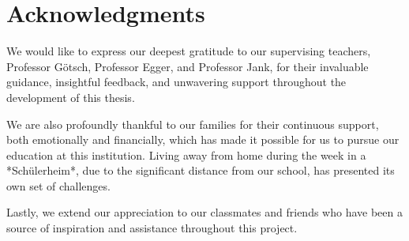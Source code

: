 \chapter*{Acknowledgments}

We would like to express our deepest gratitude to our supervising teachers, Professor Götsch, Professor Egger, and Professor Jank, for their invaluable guidance, insightful feedback, and unwavering support throughout the development of this thesis.

We are also profoundly thankful to our families for their continuous support, both emotionally and financially, which has made it possible for us to pursue our education at this institution. Living away from home during the week in a *Schülerheim*, due to the significant distance from our school, has presented its own set of challenges.

Lastly, we extend our appreciation to our classmates and friends who have been a source of inspiration and assistance throughout this project.
